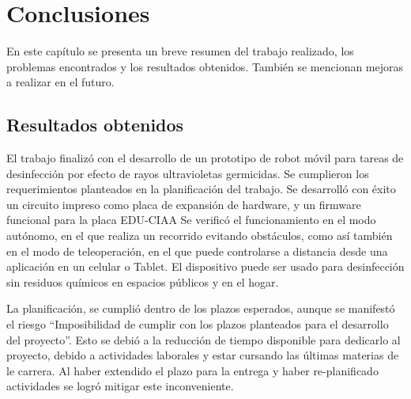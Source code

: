 
\chapter{Conclusiones} %

\label{Chapter5} %





En este capítulo se presenta un breve resumen del trabajo realizado, los problemas encontrados y los resultados obtenidos. También se mencionan mejoras a realizar en el futuro.

\section{Resultados obtenidos}

El trabajo finalizó con el desarrollo de un prototipo de robot móvil para tareas de desinfección por efecto de rayos ultravioletas germicidas. Se cumplieron los requerimientos planteados en la planificación del trabajo.
Se desarrolló con éxito un circuito impreso como placa de expansión de hardware, y un firmware funcional para la placa EDU-CIAA  
Se verificó el funcionamiento en el modo autónomo, en el que realiza un recorrido evitando obstáculos, como así también  en el  modo de teleoperación, en el que puede controlarse a distancia desde una  aplicación en un celular o Tablet.
El dispositivo puede ser usado para desinfección sin residuos químicos en espacios públicos y en el hogar. 

La planificación, se cumplió dentro de los plazos esperados, aunque se manifestó el riesgo “Imposibilidad de cumplir con los plazos planteados para el desarrollo del proyecto”. Esto se debió a la  reducción de tiempo disponible para dedicarlo al proyecto,  debido a actividades laborales y estar cursando las últimas materias de le carrera.  Al haber extendido el plazo para la entrega y haber re-planificado actividades se logró mitigar este inconveniente.


